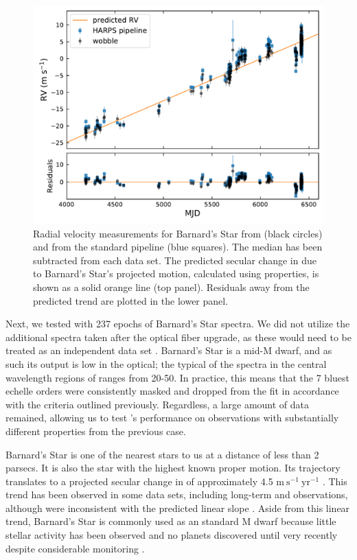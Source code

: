 \documentclass[twocolumn]{aastex62}
\newcommand{\Mdwarf}{Barnard's Star\xspace} %
\begin{document}
\begin{figure}
\centering
\includegraphics[width=5in]{barnards_rvs}
\caption{Radial velocity measurements for \Mdwarf from \wobble (black circles) and from the standard \HARPS pipeline (blue squares). The median \RV has been subtracted from each data set. The predicted secular change in \RV due to \Mdwarf's projected motion, calculated using \gaia properties, is shown as a solid orange line (top panel). Residuals away from the predicted trend are plotted in the lower panel.}
\label{fig:barnards_rvs}
\end{figure}

Next, we tested \wobble with 237 epochs of \Mdwarf spectra. 
We did not utilize the additional spectra taken after the  optical fiber upgrade, as these would need to be treated as an independent data set \citep{LoCurto2015}. 
\Mdwarf is a mid-M dwarf, and as such its output is low in the optical; the typical \SNR of the spectra in the central wavelength regions of \HARPS ranges from 20-50. 
In practice, this means that the 7 bluest echelle orders were consistently masked and dropped from the fit in accordance with the \SNR criteria outlined previously. 
Regardless, a large amount of data remained, allowing us to test \wobble's performance on observations with substantially different properties from the previous case.

\Mdwarf is one of the nearest stars to us at a distance of less than 2 parsecs. 
It is also the star with the highest known proper motion. 
Its trajectory translates to a projected secular change in \RV of approximately 4.5 $\mathrm{m}~\mathrm{s}^{-1}~\mathrm{yr}^{-1}$ \citep{Kurster2003}. 
This trend has been observed in some data sets, including long-term \HARPS and  observations, although  \RVs were inconsistent with the predicted linear slope \citep{Kurster2003, Bonfils2013, Choi2013, Montet2014}. 
Aside from this linear trend, \Mdwarf is commonly used as an \RV standard M dwarf because little stellar activity has been observed and no planets discovered until very recently despite considerable \RV monitoring \citep{Ribas2018}. 
\end{document}

